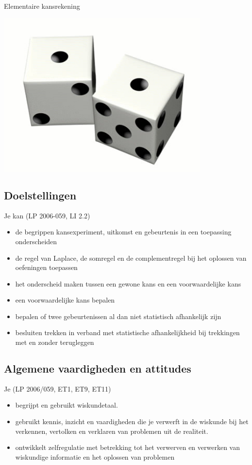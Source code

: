 \documentclass[12pt,twoside]{article}
\begin{document}
\thispagestyle{empty}
\begin{center}
  \begin{mdframed}
  \centering
  \fontsize{40}{60}\selectfont Elementaire kansrekening
  \end{mdframed}
  \vfill
  \includegraphics[width=0.8\textwidth]{dice}
  \vfill
\end{center}
\subsection*{Doelstellingen}
{\singlespacing
Je kan \hfill  {\scriptsize(LP 2006-059, LI 2.2)}
\begin{itemize}
  \item de begrippen kansexperiment, uitkomst en gebeurtenis in een toepassing onderscheiden
  \item de regel van Laplace, de somregel en de complementregel bij het oplossen van oefeningen toepassen
  \item het onderscheid maken tussen een gewone kans en een voorwaardelijke kans
  \item een voorwaardelijke kans bepalen
  \item bepalen of twee gebeurtenissen al dan niet statistisch afhankelijk zijn
  \item besluiten trekken in verband met statistische afhankelijkheid bij trekkingen met en zonder terugleggen
\end{itemize}}
\subsection*{Algemene vaardigheden en attitudes}
{\singlespacing
Je \hfill {\scriptsize(LP 2006/059, ET1, ET9, ET11)}
\begin{itemize}
  \itemsep0em
  \item begrijpt en gebruikt wiskundetaal.
  \item gebruikt kennis, inzicht en vaardigheden die je verwerft in de wiskunde bij het verkennen, vertolken en verklaren van problemen uit de realiteit.
  \item ontwikkelt zelfregulatie met betrekking tot het verwerven en verwerken van wiskundige informatie en het oplossen van problemen
\end{itemize}
}
\end{document}
